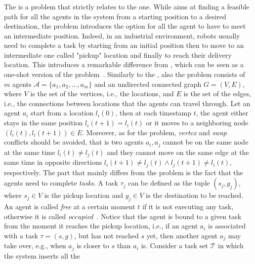 \subsubsection{}
The  is a problem that strictly relates to the  one. 
While \MAPF aims at finding a feasible path for all the agents in the system 
from a starting position to a desired destination, the  problem 
introduces the option for all the agent to have to meet an intermediate 
position. Indeed, in an industrial environment, robots usually need to complete
a task by starting from an initial position then to move to an intermediate one 
called "pickup" location and finally to reach their delivery location. \newline
This introduces a remarkable difference from \MAPF, which can be seen as a
one-shot version of the problem~\cite{onlineMAPD}.\newline
Similarly to the \MAPF, also the  problem consists of $m$ agents
$\mathcal{A}=\{a_1,a_2,\hdots,a_m\}$ and an undirected connected graph 
$G=(V,E)$, where $V$ is the set of the vertices, i.e., the locations, and $E$
is the set of the edges, i.e., the connections between locations that the
agents can travel through. Let an agent $a_i$ start from a location $l_i(0)$,
then at each timestamp $t$, the agent either stays in the same position
$l_i(t+1)=l_i(t)$ or it moves to a neighboring node $(l_i(t), l_i(t+1))\in E$.
Moreover, as for the \MAPF problem, \textit{vertex} and \textit{swap} conflicts
should be avoided, that is two agents $a_i, a_j$ cannot be on the same node at 
the same time $l_i(t)\neq l_j(t)$ and they cannot move on the same edge at the
same time in opposite directions $l_i(t+1)\neq l_j(t) \wedge l_j(t+1)\neq
l_i(t)$, respectively. \newline
The part that mainly differs from the \MAPF problem is the fact that the agents
need to complete \textit{tasks}. A task $\tau_j$ can be defined as the tuple
$(s_j,g_j)$, where $s_j\in V$ is the pickup location and $g_j\in V$ is the 
destination to be reached. An agent is called \textit{free} at a certain moment
$t$ if it is not executing any task, otherwise it is called 
\textit{occupied}~\cite{onlineMAPD}. Notice that the agent is bound to a given
task from the moment it reaches the pickup location, i.e., if an agent $a_i$ is
associated with a task $\tau=(s, g)$, but has not reached $s$ yet, then another
agent $a_j$ may take over, e.g., when $a_j$ is closer to $s$ than $a_i$ is.
Consider a task set $\mathcal{T}$ in which the system inserts all the 
